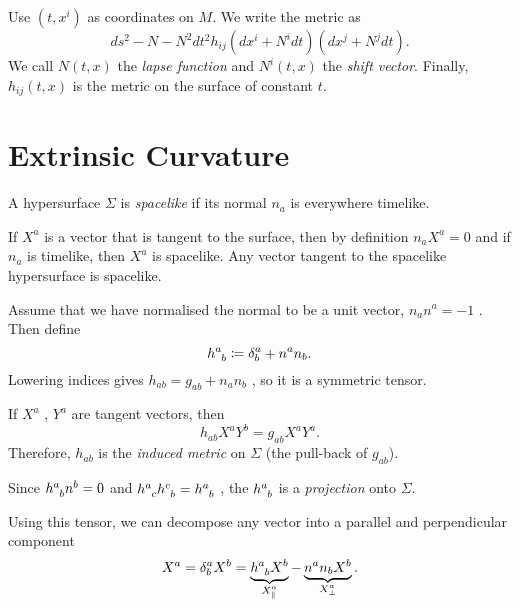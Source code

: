 Use $(t, x^{i})$ as coordinates on $M$.
We write the metric as 
\begin{equation}
  ds^2-N -N^2 dt^2 h_{ij} (dx^{i} + N^{i} dt) (dx^{j} + N^{j} dt).
\end{equation}
We call $N(t, x)$ the \emph{lapse function} and $N^{i}(t, x)$ the \emph{shift vector}. Finally, $h_{ij}(t, x)$ is the metric on the surface of constant $t$.

\section{Extrinsic Curvature}%
\label{sec:extrinsic_curvature}

\begin{definition}
  A hypersurface $\Sigma$ is \emph{spacelike} if its normal $n_{a}$ is everywhere timelike.
\end{definition}

If $X^{a}$  is a vector that is tangent to the surface, then by definition $n_{a} X^{a} =0$  and if $n_{a}$ is timelike, then $X^{a}$  is spacelike.
Any vector tangent to the spacelike hypersurface is spacelike.

Assume that we have normalised the normal to be a unit vector, $n_{a} n^{a} = -1$ . Then define 
\begin{equation}
  h\indices{^{a}_{b}} \coloneqq \delta^{a}_{b} + n^{a} n_{b}.
\end{equation}
Lowering indices gives $h_{ab} = g_{ab} + n_{a} n_{b}$ , so it is a symmetric tensor.

If $X^{a}$ , $Y^{a}$  are tangent vectors, then
\begin{equation}
  h_{ab} X^{a} Y^{b} = g_{ab} X^{a} Y^{a}.
\end{equation}
Therefore, $h_{ab}$  is the \emph{induced metric} on $\Sigma$  (the pull-back of $g_{ab}$).

Since $h\indices{^{a}_{b}} n^{b} = 0$ and $h\indices{^{a}_{c}} h\indices{^{c}_{b}} = h\indices{^{a}_{b}}$ , the  $h\indices{^{a}_{b}}$  is a \emph{projection} onto $\Sigma$.

Using this tensor, we can decompose any vector into a parallel and perpendicular component
 \begin{equation}
  X^{a} = \delta^{a}_{b} X^{b} = \underbrace{h\indices{^{a}_{b}} X^{b}}_{\mathclap{X^{a}_{\parallel}}} - \underbrace{n^{a} n_{b} X^{b}}_{\mathclap{X^{a}_{\perp}}}.
\end{equation}

\begin{figure}[tbhp]
  \centering
  \def\svgwidth{0.4\columnwidth}
  
  \caption{}
  \label{fig:l7f5}
\end{figure}

